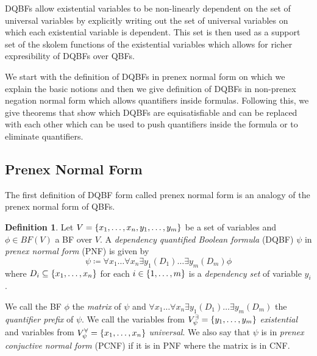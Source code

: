 \documentclass[
  digital, %
  twoside, %
  table,   %
  nolof,     %
  nolot,     %
]{fithesis3}
\let\setbuilder\set
\newcommand{\simpleset}[1]{\{{#1}\}}
\renewcommand{\set}[1]{\normalexpandarg\IfSubStr{#1}{|}{\setbuilder{#1}}{\simpleset{#1}}}
\theoremstyle{definition}
\newtheorem{definition}{Definition}
\theoremstyle{remark}
\newcommand{\BF}[1]{BF(#1)}
\newcommand{\evars}[1]{V_{#1}^{\exists}}
\newcommand{\uvars}[1]{V_{#1}^{\forall}}
\begin{document}
DQBFs allow existential variables to be non-linearly dependent on the set of universal variables by explicitly writing out the set of universal variables on which each existential variable is dependent. This set is then used as a support set of the skolem functions of the existential variables which allows for richer expresibility of DQBFs over QBFs.  

We start with the definition of DQBFs in prenex normal form on which we explain the basic notions and then we give definition of DQBFs in non-prenex negation normal form which allows quantifiers inside formulas. Following this, we give theorems that show which DQBFs are equisatisfiable and can be replaced with each other which can be used to push quantifiers inside the formula or to eliminate quantifiers.

\subsection{Prenex Normal Form}
The first definition of DQBF form called prenex normal form is an analogy of the prenex normal form of QBFs.


\begin{definition}
  Let $V = \set{x_1, \dots, x_n, y_1, \dots, y_m}$ be a set of variables and $\phi \in \BF{V}$ a BF over $V$. A \emph{dependency quantified Boolean formula} (DQBF) $\psi$ in \emph{prenex normal form} (PNF) is given by
  \[\psi \coloneqq \forall x_1 \dots \forall x_n \exists y_1 (D_1) \dots \exists y_m (D_m) \phi\]
  where $D_i \subseteq \set{x_1, \dots, x_n}$ for each $i \in \set{1,\dots,m}$ is a \emph{dependency set} of variable $y_i$.
  \label{def:DQBF:PNF}
\end{definition}
We call the BF $\phi$ the \emph{matrix} of $\psi$ and $\forall x_1 \dots \forall x_n \exists y_1 (D_1) \dots \exists y_m (D_m)$ the \emph{quantifier prefix} of $\psi$. We call the variables from $\evars{\psi} = \set{y_1,\dots,y_m}$ \emph{existential} and variables from $\uvars{\psi} = \set{x_1,\dots,x_n}$ \emph{universal}. We also say that $\psi$ is in \emph{prenex conjuctive normal form} (PCNF) if it is in PNF where the matrix is in CNF.
\end{document}
